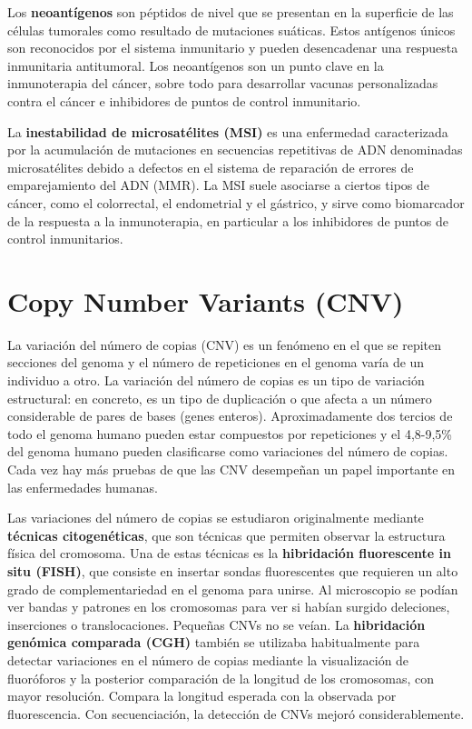 Los \textbf{neoantígenos} son péptidos de nivel que se presentan en la superficie de las células tumorales como resultado de mutaciones suáticas. Estos antígenos únicos son reconocidos por el sistema inmunitario y pueden desencadenar una respuesta inmunitaria antitumoral. Los neoantígenos son un punto clave en la inmunoterapia del cáncer, sobre todo para desarrollar vacunas personalizadas contra el cáncer e inhibidores de puntos de control inmunitario.

La \textbf{inestabilidad de microsatélites (MSI)} es una enfermedad caracterizada por la acumulación de mutaciones en secuencias repetitivas de ADN denominadas microsatélites debido a defectos en el sistema de reparación de errores de emparejamiento del ADN (MMR). La MSI suele asociarse a ciertos tipos de cáncer, como el colorrectal, el endometrial y el gástrico, y sirve como biomarcador de la respuesta a la inmunoterapia, en particular a los inhibidores de puntos de control inmunitarios.

\chapter{Copy Number Variants (CNV)}
La variación del número de copias (CNV) es un fenómeno en el que se repiten secciones del genoma
y el número de repeticiones en el genoma varía de un individuo a otro.
La variación del número de copias es un tipo de variación estructural: en concreto, es un tipo de duplicación o que afecta a un número considerable de pares de bases (genes enteros).
Aproximadamente dos tercios de todo el genoma humano pueden estar compuestos por repeticiones y el 4,8-9,5\% del genoma humano pueden clasificarse como variaciones del número de copias.
Cada vez hay más pruebas de que las CNV desempeñan un papel importante en las enfermedades humanas.

Las variaciones del número de copias se estudiaron originalmente mediante \textbf{técnicas citogenéticas}, que son técnicas que permiten observar la estructura física del cromosoma.
Una de estas técnicas es la \textbf{hibridación fluorescente in situ (FISH)}, que consiste en insertar sondas fluorescentes que requieren un alto grado de complementariedad en el genoma para unirse. Al microscopio se podían ver bandas y patrones en los cromosomas para ver si habían surgido deleciones, inserciones o translocaciones. Pequeñas CNVs no se veían.
La \textbf{hibridación genómica comparada (CGH)} también se utilizaba habitualmente para detectar variaciones en el número de copias mediante la visualización de fluoróforos y la posterior comparación de la longitud de los cromosomas, con mayor resolución. Compara la longitud esperada con la observada por fluorescencia. Con secuenciación, la detección de CNVs mejoró considerablemente. 

